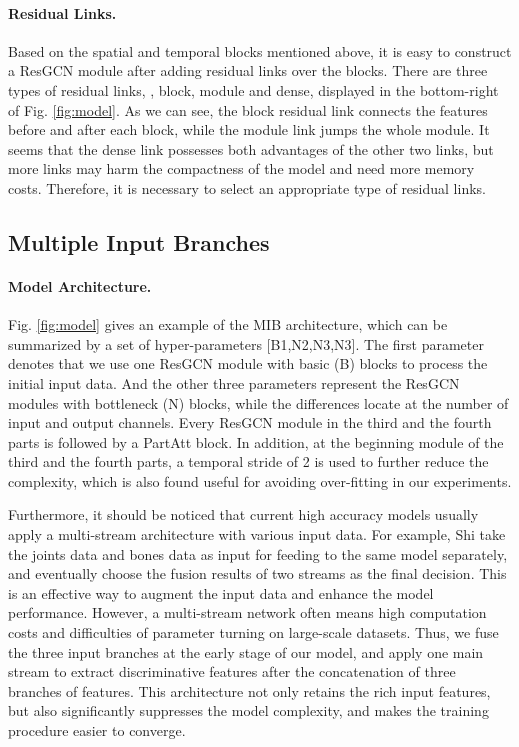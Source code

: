 \documentclass[sigconf]{acmart}
\begin{document}
\paragraph{Residual Links.} Based on the spatial and temporal blocks mentioned above, it is easy to construct a ResGCN module after adding residual links over the blocks. There are three types of residual links, \ie, block, module and dense, displayed in the bottom-right of Fig. \ref{fig:model}. As we can see, the block residual link connects the features before and after each block, while the module link jumps the whole module. It seems that the dense link possesses both advantages of the other two links, but more links may harm the compactness of the model and need more memory costs. Therefore, it is necessary to select an appropriate type of residual links.

\subsection{Multiple Input Branches}
\label{ssec:branches}

\paragraph{Model Architecture.} Fig. \ref{fig:model} gives an example of the MIB architecture, which can be summarized by a set of hyper-parameters [B1,N2,N3,N3]. The first parameter denotes that we use one ResGCN module with basic (B) blocks to process the initial input data. And the other three parameters represent the ResGCN modules with bottleneck (N) blocks, while the differences locate at the number of input and output channels. Every ResGCN module in the third and the fourth parts is followed by a PartAtt block. In addition, at the beginning module of the third and the fourth parts, a temporal stride of 2 is used to further reduce the complexity, which is also found useful for avoiding over-fitting in our experiments.

Furthermore, it should be noticed that current high accuracy models usually apply a multi-stream architecture with various input data. For example, Shi \etal \cite{shi2019two} take the joints data and bones data as input for feeding to the same model separately, and eventually choose the fusion results of two streams as the final decision. This is an effective way to augment the input data and enhance the model performance. However, a multi-stream network often means high computation costs and difficulties of parameter turning on large-scale datasets. Thus, we fuse the three input branches at the early stage of our model, and apply one main stream to extract discriminative features after the concatenation of three branches of features. This architecture not only retains the rich input features, but also significantly suppresses the model complexity, and makes the training procedure easier to converge.
\end{document}
